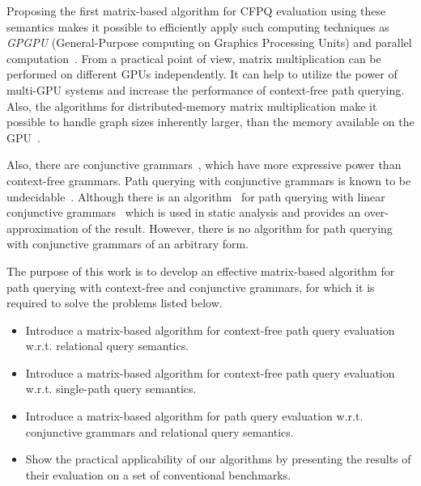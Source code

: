 Proposing the first matrix-based algorithm for CFPQ evaluation using these semantics makes it possible to efficiently apply such computing techniques as \emph{GPGPU} (General-Purpose computing on Graphics Processing Units) and parallel computation~\cite{matricesOnGPGPU}. From a practical point of view, matrix multiplication can be performed on different GPUs independently. It can help to utilize the power of multi-GPU systems and increase the performance of context-free path querying. Also, the algorithms for distributed-memory matrix multiplication make it possible to handle graph sizes inherently larger, than the memory available on the GPU~\cite{choi1994pumma, hetero_multi-GPU, MM_on_multi-GPU}.

Also, there are conjunctive grammars~\cite{okhotinConjAndBool}, which have more expressive power than context-free grammars. Path querying with conjunctive grammars is known to be undecidable~\cite{hellingsRelational}. Although there is an algorithm~\cite{zhang2017context} for path querying with linear conjunctive grammars~\cite{okhotinConjAndBool} which is used in static analysis and provides an over-approximation of the result. However, there is no algorithm for path querying with conjunctive grammars of an arbitrary form.

The purpose of this work is to develop an effective matrix-based algorithm for path querying with context-free and conjunctive grammars, for which it is required to solve the problems listed below.
\begin{itemize}
	\item Introduce a matrix-based algorithm for context-free path query evaluation w.r.t. relational query semantics.
	\item Introduce a matrix-based algorithm for context-free path query evaluation w.r.t. single-path query semantics.
	\item Introduce a matrix-based algorithm for path query evaluation w.r.t.
	conjunctive grammars and relational query semantics.
	\item Show the practical applicability of our algorithms by presenting the results of their evaluation on a set of conventional benchmarks.
\end{itemize}
